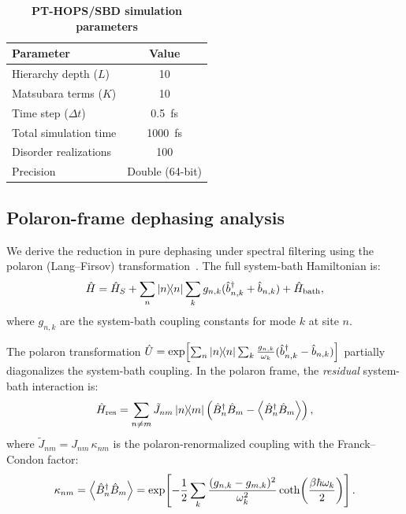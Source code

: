\documentclass[11pt,a4paper]{article}
\begin{document}
\begin{table}[h]
\centering
\caption{\textbf{PT-HOPS/SBD simulation parameters}}
\label{tab:SI_parameters}
\begin{tabular}{lc}
\toprule
\textbf{Parameter} & \textbf{Value} \\
\midrule
Hierarchy depth ($L$) & 10 \\
Matsubara terms ($K$) & 10 \\
Time step ($\Delta t$) & \SI{0.5}{\femto\second} \\
Total simulation time & \SI{1000}{\femto\second} \\
Disorder realizations & 100 \\
Precision & Double (64-bit) \\
\bottomrule
\end{tabular}
\end{table}

\subsection{Polaron-frame dephasing analysis}
\label{sec:polaron_dephasing}

We derive the reduction in pure dephasing under spectral filtering using the polaron (Lang--Firsov) transformation~\cite{Huelga2013,Chin2011}. The full system-bath Hamiltonian is:
\begin{equation}
\hat{H} = \hat{H}_S + \sum_n \dyad{n} \sum_k g_{n,k}(\hat{b}_{n,k}^\dagger + \hat{b}_{n,k}) + \hat{H}_{\mathrm{bath}},
\label{eq:SI_full_hamiltonian}
\end{equation}
where $g_{n,k}$ are the system-bath coupling constants for mode $k$ at site $n$.

The polaron transformation $\hat{U} = \exp\!\left[\sum_n \dyad{n} \sum_k \frac{g_{n,k}}{\omega_k}(\hat{b}_{n,k}^\dagger - \hat{b}_{n,k})\right]$ partially diagonalizes the system-bath coupling. In the polaron frame, the \textit{residual} system-bath interaction is:
\begin{equation}
\hat{H}_{\mathrm{res}} = \sum_{n \neq m} \tilde{J}_{nm} \dyad{n}{m} \left(\hat{B}_n^\dagger \hat{B}_m - \expval{\hat{B}_n^\dagger \hat{B}_m}\right),
\label{eq:SI_residual}
\end{equation}
where $\tilde{J}_{nm} = J_{nm}\, \kappa_{nm}$ is the polaron-renormalized coupling with the Franck--Condon factor:
\begin{equation}
\kappa_{nm} = \expval{\hat{B}_n^\dagger \hat{B}_m} = \exp\!\left[-\frac{1}{2}\sum_k \frac{(g_{n,k} - g_{m,k})^2}{\omega_k^2} \coth\!\left(\frac{\beta\hbar\omega_k}{2}\right)\right].
\label{eq:SI_FC_factor}
\end{equation}
\end{document}
